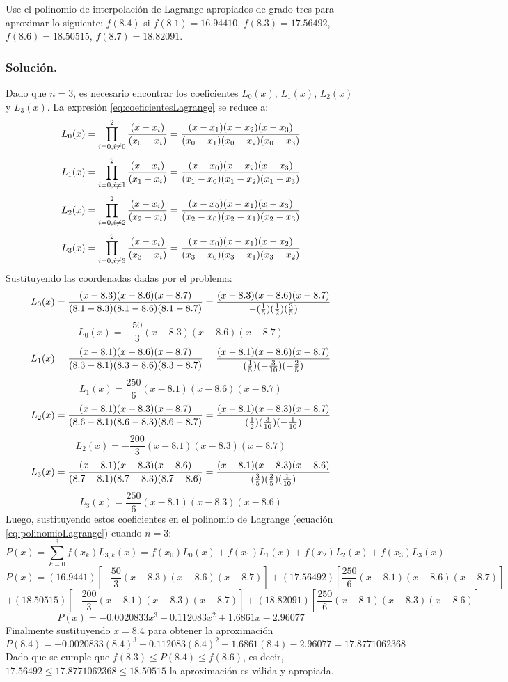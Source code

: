 \begin{exerciseT}
	Use el polinomio de interpolación de Lagrange apropiados de grado tres para aproximar lo siguiente: $f(8.4)$ si 
	$f(8.1)=16.94410$, $f(8.3)=17.56492$, $f(8.6)=18.50515$, $f(8.7)=18.82091$.
	\subsubsection*{Solución.} Dado que $n=3$, es necesario encontrar los coeficientes $L_0(x)$, $L_1(x)$, $L_2(x)$ y $L_3(x)$. 
	La expresión \ref{eq:coeficientesLagrange} 
		se reduce a:
			$$L_0(x) = \prod_{i=0, i\not= 0}^{2} {(x-x_i) \over (x_0 - x_i)} = {(x-x_1)(x-x_2)(x-x_3)\over (x_0-x_1)(x_0-x_2)(x_0-x_3)}$$	
			$$L_1(x) = \prod_{i=0, i\not= 1}^{2} {(x-x_i) \over (x_1 - x_i)} = {(x-x_0)(x-x_2)(x-x_3)\over (x_1-x_0)(x_1-x_2)(x_1-x_3)}$$	
			$$L_2(x) = \prod_{i=0, i\not= 2}^{2} {(x-x_i) \over (x_2 - x_i)} = {(x-x_0)(x-x_1)(x-x_3)\over (x_2-x_0)(x_2-x_1)(x_2-x_3)}$$
			$$L_3(x) = \prod_{i=0, i\not= 3}^{2} {(x-x_i) \over (x_3 - x_i)} = {(x-x_0)(x-x_1)(x-x_2)\over (x_3-x_0)(x_3-x_1)(x_3-x_2)}$$
		Sustituyendo las coordenadas dadas por el problema:
			$$L_0(x) = {(x-8.3)(x-8.6)(x-8.7)\over (8.1-8.3)(8.1-8.6)(8.1-8.7)} = {(x-8.3)(x-8.6)(x-8.7)\over -(\frac{1}{5})(\frac{1}{2})(\frac{3}{5})}$$
			$$L_0(x) = -\frac{50}{3}(x-8.3)(x-8.6)(x-8.7)$$
			$$L_1(x) = {(x-8.1)(x-8.6)(x-8.7)\over (8.3-8.1)(8.3-8.6)(8.3-8.7)} = {(x-8.1)(x-8.6)(x-8.7)\over (\frac{1}{5})(-\frac{3}{10})(-\frac{2}{5})}$$
			$$L_1(x) = \frac{250}{6}(x-8.1)(x-8.6)(x-8.7)$$
			$$L_2(x) = {(x-8.1)(x-8.3)(x-8.7)\over (8.6-8.1)(8.6-8.3)(8.6-8.7)} = {(x-8.1)(x-8.3)(x-8.7)\over (\frac{1}{2})(\frac{3}{10})(-\frac{1}{10})}$$
			$$L_2(x) = -\frac{200}{3}(x-8.1)(x-8.3)(x-8.7)$$
			$$L_3(x) = {(x-8.1)(x-8.3)(x-8.6)\over (8.7-8.1)(8.7-8.3)(8.7-8.6)} = {(x-8.1)(x-8.3)(x-8.6)\over (\frac{3}{5})(\frac{2}{5})(\frac{1}{10})}$$
			$$L_3(x) = \frac{250}{6}(x-8.1)(x-8.3)(x-8.6)$$	
		Luego, sustituyendo estos coeficientes en el polinomio de Lagrange (ecuación \ref{eq:polinomioLagrange}) cuando $n=3$:
			$$P(x) = \sum_{k=0}^3 f(x_k)L_{3,k}(x) = f(x_0)L_0(x) + f(x_1)L_1(x) + f(x_2)L_2(x) + f(x_3)L_3(x)$$
			$$P(x) = (16.9441)\left[-\frac{50}{3} (x-8.3)(x-8.6)(x-8.7) \right] + (17.56492)\left[\frac{250}{6} (x-8.1)(x-8.6)(x-8.7) \right]$$
			$$+ (18.50515)\left[-\frac{200}{3} (x-8.1)(x-8.3)(x-8.7) \right] + (18.82091)\left[\frac{250}{6} (x-8.1)(x-8.3)(x-8.6) \right]$$
			$$P(x) = -0.0020833x^3 + 0.112083x^2 + 1.6861x - 2.96077$$
		Finalmente sustituyendo $x=8.4$ para obtener la aproximación
			$$P(8.4) = -0.0020833(8.4)^3 + 0.112083(8.4)^2 + 1.6861(8.4) - 2.96077 = 17.8771062368$$
		Dado que se cumple que $f(8.3)\leq P(8.4)\leq f(8.6)$, es decir, $17.56492 \leq 17.8771062368 \leq 18.50515$ la aproximación es válida y apropiada.
		
\end{exerciseT}


